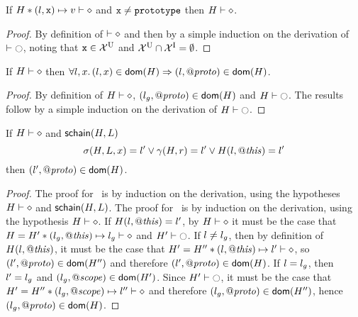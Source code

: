 \documentclass{article}
\begin{document}
%
\begin{lemma}[Delete]\label{lemma:delete}
If $H\mathbin{*}(l,\mbox{\texttt{{\upshape x}}})\mapsto v\vdash\diamond$ and $\mbox{\texttt{{\upshape x}}}\neq\mbox{\texttt{{\upshape prototype}}}$ then $H\vdash\diamond$.
\end{lemma}
%
\begin{proof}
By definition of $\vdash\diamond$ and then by a simple induction on the derivation of $\vdash\ocircle$, noting that $\mbox{\texttt{{\upshape x}}}\in\mathcal{X}^{{\mbox{\textsc{u}}}}$ and $\mathcal{X}^{{\mbox{\textsc{u}}}}\cap\mathcal{X}^{{\mbox{\textsc{i}}}}=\emptyset$.
\end{proof}


%
\begin{lemma}[Prototypes]\label{lemma:protochain}
If $H\vdash\diamond$ then $\forall l,x\mathpunct{.} (l,x)\in\mathsf{dom}(H) \Rightarrow (l,\mathit{@proto})\in\mathsf{dom}(H)$.
\end{lemma}
%
\begin{proof}
By definition of $H\vdash\diamond$, $(l_g,\mathit{@proto})\in\mathsf{dom}(H)$ and $H\vdash\ocircle$.
%
The results follow by a simple induction on the derivation of $H\vdash\ocircle$.
\end{proof}




%
\begin{lemma}[Allocation]\label{lemma:allocation}
If $H\vdash\diamond$ and $\mathsf{schain}(H,L)$ 
\[\sigma(H,L,x)=l'\vee
\gamma(H,r)=l'\vee
H(l,\mathit{@this})=l'\]
then $(l',\mathit{@proto})\in\mathsf{dom}(H)$.
\end{lemma}
%
\begin{proof}
%
The proof for \scope\ is by induction on the derivation, using the hypotheses $H\vdash\diamond$ and $\mathsf{schain}(H,L)$.
%
The proof for \getValue\ is by induction on the derivation, using the hypothesis $H\vdash\diamond$.
%
If $H(l,\mathit{@this})=l'$, by $H\vdash\diamond$ it must be the case that $H=H'\mathbin{*}(l_g,\mathit{@this})\mapsto l_g\vdash\diamond$ and $H'\vdash\ocircle$.
%
If $l\neq l_g$, then by definition of $H(l,\mathit{@this})$, it must be the case that $H'=H''\mathbin{*}(l,\mathit{@this})\mapsto l'\vdash\diamond$, so $(l',\mathit{@proto})\in\mathsf{dom}(H'')$ and therefore $(l',\mathit{@proto})\in\mathsf{dom}(H)$.
%
If $l=l_g$, then $l'=l_g$ and $(l_g,\mathit{@scope})\in \mathsf{dom}(H')$.
%
Since $H'\vdash\ocircle$, it must be the case that $H'=H''\mathbin{*}(l_g,\mathit{@scope})\mapsto l''\vdash\diamond$ and therefore $(l_g,\mathit{@proto})\in\mathsf{dom}(H'')$, hence $(l_g,\mathit{@proto})\in\mathsf{dom}(H)$.
%
\end{proof}


%
\end{document}
